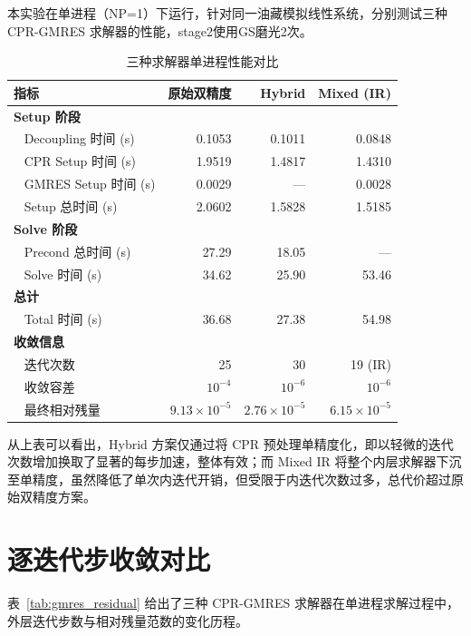 \documentclass[12pt,a4paper]{article}
\begin{document}
本实验在单进程（NP=1）下运行，针对同一油藏模拟线性系统，分别测试三种 CPR-GMRES 求解器的性能，stage2使用GS磨光2次。
\begin{table}[htbp]
\centering
\caption{三种求解器单进程性能对比}
\label{tab:compare}
\begin{tabular}{lrrr}
\toprule
指标 & 原始双精度 & Hybrid & Mixed (IR) \\
\midrule
\textbf{Setup 阶段} \\
~ Decoupling 时间 (s) & 0.1053 & 0.1011 & 0.0848 \\
~ CPR Setup 时间 (s)  & 1.9519 & 1.4817 & 1.4310 \\
~ GMRES Setup 时间 (s)& 0.0029 & ---    & 0.0028 \\
~ Setup 总时间 (s)    & 2.0602 & 1.5828 & 1.5185 \\
\midrule
\textbf{Solve 阶段} \\
~ Precond 总时间 (s)  & 27.29  & 18.05  & --- \\
~ Solve 时间 (s)      & 34.62  & 25.90  & 53.46 \\
\midrule
\textbf{总计} \\
~ Total 时间 (s)      & 36.68  & 27.38  & 54.98 \\
\midrule
\textbf{收敛信息} \\
~ 迭代次数            & 25     & 30     & 19 (IR) \\
~ 收敛容差            & $10^{-4}$ & $10^{-6}$ & $10^{-6}$ \\
~ 最终相对残量        & $9.13\times10^{-5}$ & $2.76\times10^{-5}$ & $6.15\times10^{-5}$ \\
\bottomrule
\end{tabular}
\end{table}

  从上表可以看出，Hybrid 方案仅通过将 CPR 预处理单精度化，即以轻微的迭代次数增加换取了显著的每步加速，整体有效；而 Mixed IR 将整个内层求解器下沉至单精度，虽然降低了单次内迭代开销，但受限于内迭代次数过多，总代价超过原始双精度方案。

\newpage
\section{逐迭代步收敛对比}

表~\ref{tab:gmres_residual} 给出了三种 CPR-GMRES 求解器在单进程求解过程中，外层迭代步数与相对残量范数的变化历程。
\end{document}
